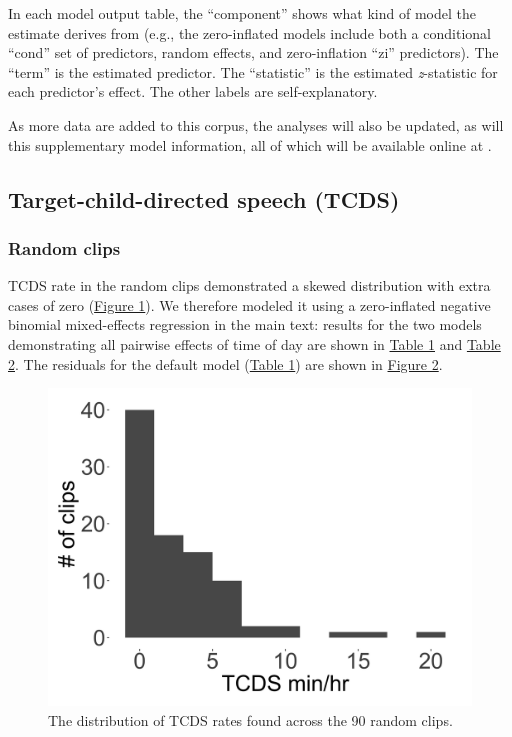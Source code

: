 \documentclass[,man,floatsintext]{apa6}
\begin{document}
In each model output table, the \enquote{component} shows what kind of
model the estimate derives from (e.g., the zero-inflated models include
both a conditional \enquote{cond} set of predictors, random effects, and
zero-inflation \enquote{zi} predictors). The \enquote{term} is the
estimated predictor. The \enquote{statistic} is the estimated
\emph{z}-statistic for each predictor's effect. The other labels are
self-explanatory.

As more data are added to this corpus, the analyses will also be
updated, as will this supplementary model information, all of which will
be available online at .

\subsection{Target-child-directed speech (TCDS)}\label{models-tcds}

\subsubsection{Random clips}\label{models-tcds-random}

TCDS rate in the random clips demonstrated a skewed distribution with
extra cases of zero (\protect\hyperlink{fig1}{Figure 1}). We therefore
modeled it using a zero-inflated negative binomial mixed-effects
regression in the main text: results for the two models demonstrating
all pairwise effects of time of day are shown in
\protect\hyperlink{tab1}{Table 1} and \protect\hyperlink{tab2}{Table 2}.
The residuals for the default model (\protect\hyperlink{tab1}{Table 1})
are shown in \protect\hyperlink{fig2}{Figure 2}.

\FloatBarrier

\begin{figure}[H]

{\centering \includegraphics[width=0.4\linewidth]{www/TCDS_random_distribution} 

}

\caption{The distribution of TCDS rates found across the 90 random clips.}\label{fig:fig1}
\end{figure}
\end{document}
